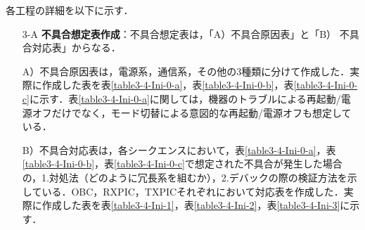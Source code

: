 各工程の詳細を以下に示す．
\begin{itemize}
	\item[3-A] \textbf{不具合想定表作成}：不具合想定表は，「A）不具合原因表」と「B） 不具合対応表」からなる．
	
	A）不具合原因表は，電源系，通信系，その他の3種類に分けて作成した．実際に作成した表を表\ref{table3-4-Ini-0-a}，表\ref{table3-4-Ini-0-b}，表\ref{table3-4-Ini-0-c}に示す．表\ref{table3-4-Ini-0-a}に関しては，機器のトラブルによる再起動/電源オフだけでなく，モード切替による意図的な再起動/電源オフも想定している．
	
	B）不具合対応表は，各シークエンスにおいて，表\ref{table3-4-Ini-0-a}，表\ref{table3-4-Ini-0-b}，表\ref{table3-4-Ini-0-c}で想定された不具合が発生した場合の，1.対処法（どのように冗長系を組むか），2.デバックの際の検証方法を示している．OBC，RXPIC，TXPICそれぞれにおいて対応表を作成した．実際に作成した表を表\ref{table3-4-Ini-1}，表\ref{table3-4-Ini-2}，表\ref{table3-4-Ini-3}に示す．
	

\end{itemize}

